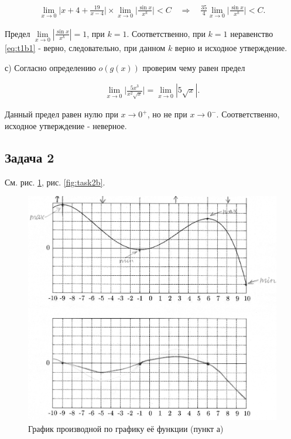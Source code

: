 \documentclass[a4paper,11pt]{article}
\begin{document}
\begin{align}
\label{eq:t1b1}
\lim\limits_{x \rightarrow 0} \bigg\lvert x+4 + \frac{19}{x-4} \bigg\rvert \times
\lim\limits_{x \rightarrow 0} \bigg\lvert \frac{\sin x}{x^k} \bigg\rvert < C
\quad \Rightarrow \quad
\frac{35}{4} \lim\limits_{x \rightarrow 0} \bigg\lvert \frac{\sin x}{x^k} \bigg\rvert < C.
\end{align}

Предел $\lim\limits_{x \rightarrow 0} | \frac{\sin x}{x^k} | = 1$, при $k = 1$. Соответственно, при $k = 1$ неравенство \ref{eq:t1b1} - верно, следовательно, при данном $k$ верно и исходное утверждение.

\bigskip

с) Согласно определению $o(g(x))$ проверим чему равен предел

\begin{align}
\lim\limits_{x \rightarrow 0} \bigg\lvert \frac{5x^3}{x^2\sqrt{x}} \bigg\rvert 
= \lim\limits_{x \rightarrow 0} | 5\sqrt{x} |.
\end{align}

Данный предел равен нулю при $x \rightarrow 0^+$, но не при $x \rightarrow 0^-$. Соответственно, исходное утверждение - неверное.

\subsection{Задача 2}

См. рис. \ref{fig:task2a}, рис. \ref{fig:task2b}.

\begin{figure}[h!]
  \centering
    \includegraphics[scale=0.7]{images/task2a.jpg}
  \caption{График производной по графику её функции (пункт а)}
  \label{fig:task2a}
\end{figure}
\end{document}
